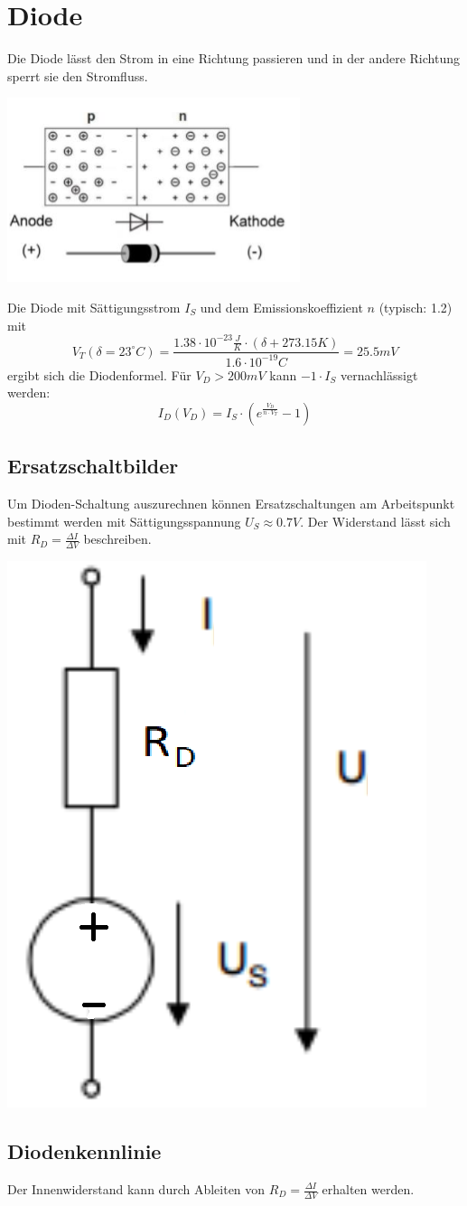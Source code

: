 \section{Diode}\label{dioden}
Die Diode lässt den Strom in eine Richtung passieren und in der andere Richtung sperrt sie den Stromfluss.
\begin{center}
	\includegraphics[width=0.4\columnwidth]{Images/diode_grafik}
\end{center}
Die Diode mit Sättigungsstrom $I_S$ und dem Emissionskoeffizient $n$ (typisch: 1.2) mit 
\[V_T(\delta = 23^\circ C) = \frac{1.38\cdot10^{-23}\frac{J}{K}\cdot (\delta + 273.15K)}{1.6\cdot10^{-19}C} = 25.5mV\]
ergibt sich die Diodenformel. Für $V_D > 200mV$ kann $-1\cdot I_S$ vernachlässigt werden:
\[
I_D(V_D) = I_S \cdot \left(e^{\frac{V_D}{n\cdot V_T}}- 1\right)
\]

\subsection{Ersatzschaltbilder}
Um Dioden-Schaltung auszurechnen können Ersatzschaltungen am Arbeitspunkt bestimmt werden mit Sättigungsspannung $U_S \approx 0.7V$. Der Widerstand lässt sich mit $R_D = \frac{\Delta I}{\Delta V}$ beschreiben. \\
\begin{center}
	\includegraphics[width=0.3\columnwidth]{Images/diode_esb}
\end{center}

\subsection{Diodenkennlinie}
Der Innenwiderstand kann durch Ableiten von $R_D = \frac{\Delta I}{\Delta V}$ erhalten werden.\\

